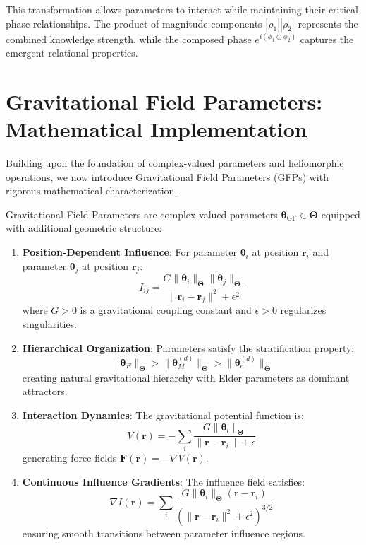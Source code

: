 This transformation allows parameters to interact while maintaining their critical phase relationships. The product of magnitude components $|\rho_1||\rho_2|$ represents the combined knowledge strength, while the composed phase $e^{i(\phi_1 \oplus \phi_2)}$ captures the emergent relational properties.

\section{Gravitational Field Parameters: Mathematical Implementation}

Building upon the foundation of complex-valued parameters and heliomorphic operations, we now introduce Gravitational Field Parameters (GFPs) with rigorous mathematical characterization.

\begin{definition}
\label{def:gravitational_field_parameters}
Gravitational Field Parameters are complex-valued parameters $\boldsymbol{\theta}_{\text{GF}} \in \boldsymbol{\Theta}$ equipped with additional geometric structure:

\begin{enumerate}
\item \textbf{Position-Dependent Influence}: For parameter $\boldsymbol{\theta}_i$ at position $\mathbf{r}_i$ and parameter $\boldsymbol{\theta}_j$ at position $\mathbf{r}_j$:
$$I_{ij} = \frac{G \|\boldsymbol{\theta}_i\|_{\boldsymbol{\Theta}} \|\boldsymbol{\theta}_j\|_{\boldsymbol{\Theta}}}{\|\mathbf{r}_i - \mathbf{r}_j\|^2 + \epsilon^2}$$
where $G > 0$ is a gravitational coupling constant and $\epsilon > 0$ regularizes singularities.

\item \textbf{Hierarchical Organization}: Parameters satisfy the stratification property:
$$\|\boldsymbol{\theta}_E\|_{\boldsymbol{\Theta}} > \|\boldsymbol{\theta}_M^{(d)}\|_{\boldsymbol{\Theta}} > \|\boldsymbol{\theta}_e^{(d)}\|_{\boldsymbol{\Theta}}$$
creating natural gravitational hierarchy with Elder parameters as dominant attractors.

\item \textbf{Interaction Dynamics}: The gravitational potential function is:
$$V(\mathbf{r}) = -\sum_{i} \frac{G \|\boldsymbol{\theta}_i\|_{\boldsymbol{\Theta}}}{\|\mathbf{r} - \mathbf{r}_i\| + \epsilon}$$
generating force fields $\mathbf{F}(\mathbf{r}) = -\nabla V(\mathbf{r})$.

\item \textbf{Continuous Influence Gradients}: The influence field satisfies:
$$\nabla I(\mathbf{r}) = \sum_{i} \frac{G \|\boldsymbol{\theta}_i\|_{\boldsymbol{\Theta}} (\mathbf{r} - \mathbf{r}_i)}{(\|\mathbf{r} - \mathbf{r}_i\|^2 + \epsilon^2)^{3/2}}$$
ensuring smooth transitions between parameter influence regions.
\end{enumerate}
\end{definition}

